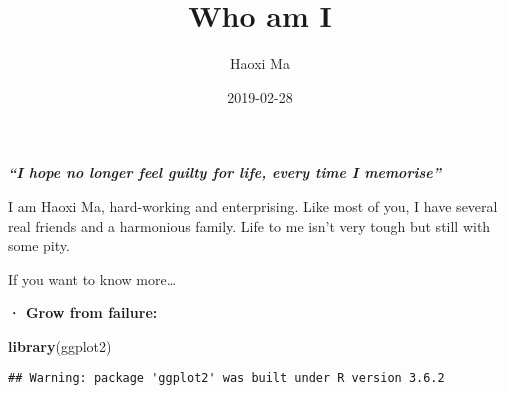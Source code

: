 \documentclass[]{article}
\title{Who am I}
\author{Haoxi Ma}
\date{2019-02-28}
\newenvironment{Shaded}{\begin{snugshade}}{\end{snugshade}}
\newcommand{\KeywordTok}[1]{\textcolor[rgb]{0.13,0.29,0.53}{\textbf{#1}}}
\newcommand{\NormalTok}[1]{#1}
\begin{document}
\maketitle

\textbf{\emph{``I hope no longer feel guilty for life, every time I
memorise''}}

I am Haoxi Ma, hard-working and enterprising. Like most of you, I have
several real friends and a harmonious family. Life to me isn't very
tough but still with some pity.

If you want to know more\ldots{}

\textbf{· Grow from failure:}

\begin{Shaded}
\begin{Highlighting}[]
\KeywordTok{library}\NormalTok{(ggplot2)}
\end{Highlighting}
\end{Shaded}

\begin{verbatim}
## Warning: package 'ggplot2' was built under R version 3.6.2
\end{verbatim}
\end{document}
